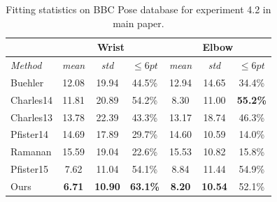 \begin{table}[t!]
    \small
    \centering
    \begin{tabular}{|l|c|c|c||c|c|c|}
        \hline
                            & \multicolumn{3}{c||}{Wrist} & \multicolumn{3}{c|}{Elbow}\\
        \hline
        \emph{Method}       & \emph{mean} & \emph{std} & $\leq 6pt$ & \emph{mean} & \emph{std} & $\leq 6pt$\\
        \hline\hline
        Buehler             & 12.08    & 19.94        & 44.5\%       & 12.94    & 14.65        & 34.4\%\\
        Charles14           & 11.81    & 20.89        & 54.2\%       &  8.30    & 11.00        & \textbf{55.2\%}\\
        Charles13           & 13.78    & 22.39        & 43.3\%       & 13.17    & 18.74        & 46.3\%\\
        Pfister14           & 14.69    & 17.89        & 29.7\%       & 14.60    & 10.59        & 14.0\%\\
        Ramanan             & 15.59    & 19.04        & 22.6\%       & 15.53    & 10.82        & 15.8\%\\
        Pfister15           & 7.62     & 11.04        & 54.1\%       &  8.84    & 11.44        & 54.9\%\\
        \hline\hline
        Ours                & \textbf{6.71}& \textbf{10.90}   & \textbf{63.1\%}       & \textbf{8.20}     &  \textbf{10.54}        & 52.1\%\\
        \hline
    \end{tabular}
    \caption{Fitting statistics on BBC Pose database for experiment 4.2 in main paper.}
    \label{tab:hand_benchmark}
\end{table}





{\small


}














